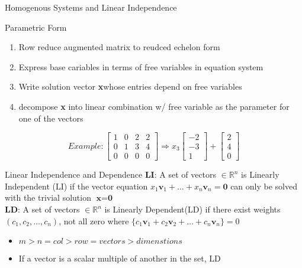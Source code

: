 \documentclass[a4paper, 12pt]{article}
\begin{document}
\begin{section}{Homogenous Systems and Linear Independence}
\begin{subsection}{Parametric Form}
\begin{enumerate}
	\item{Row reduce augmented matrix to reudced echelon form}
	\item{Express base cariables in terms of free variables in 
		equation system}
	\item{Write solution vector \textbf{x}whose entries
		depend on free variables}
	\item{decompose \textbf{x} into linear combination w/ free 
		variable as the parameter for one of the vectors}
\end{enumerate}
\begin{equation*}{Example:}
\begin{bmatrix} 
	1 & 0 & 2 & 2 \\
	0 & 1 & 3 & 4 \\
	0 & 0 & 0 & 0
\end{bmatrix} 
\Rightarrow
x_3\begin{bmatrix} -2 \\ -3 \\ 1 \end{bmatrix} +
\begin{bmatrix} 2 \\ 4 \\ 0 \end{bmatrix} 
\end{equation*}
\end{subsection}

\begin{subsection}{Linear Independence and Dependence}
\textbf{LI}:
A set of vectors $\in \mathbb{R}^n$ is Linearly Independent
(LI) if the vector equation
$x_1\textbf{v}_1+\dots+x_n\textbf{v}_n=\textbf{0}$ can only
be solved with the trivial solution $\textbf{x}=\textbf{0}$
\\

\noindent \textbf{LD}:
A set of vectors $\in \mathbb{R}^n$ is Linearly Dependent(LD) if 
there exist weights $(c_1,c_2,\dots,c_n)$, not all zero where
$\lbrace c_1\textbf{v}_1+c_2\textbf{v}_2+\dots+c_n\textbf{v}_n\rbrace=0$
\begin{itemize}
\item{$m>n=col>row=vectors>dimenstions$}
\item{If a vector is a scalar multiple of another in the set, LD}
\end{itemize}
\end{subsection}
\end{section}
\end{document}
